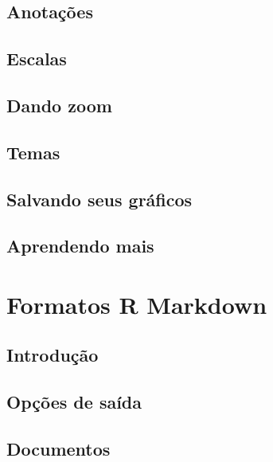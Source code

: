 \documentclass[
]{latex/krantz}
\theoremstyle{definition}
\theoremstyle{definition}
\theoremstyle{definition}
\theoremstyle{definition}
\theoremstyle{remark}
\begin{document}
\hypertarget{anotauxe7uxf5es}{%
\section{Anotações}\label{anotauxe7uxf5es}}

\hypertarget{escalas}{%
\section{Escalas}\label{escalas}}

\hypertarget{dando-zoom}{%
\section{Dando zoom}\label{dando-zoom}}

\hypertarget{temas}{%
\section{Temas}\label{temas}}

\hypertarget{salvando-seus-gruxe1ficos}{%
\section{Salvando seus gráficos}\label{salvando-seus-gruxe1ficos}}

\hypertarget{aprendendo-mais-2}{%
\section{Aprendendo mais}\label{aprendendo-mais-2}}

\hypertarget{formatos-r-markdown}{%
\chapter{Formatos R Markdown}\label{formatos-r-markdown}}

\hypertarget{introduuxe7uxe3o-19}{%
\section{Introdução}\label{introduuxe7uxe3o-19}}

\hypertarget{opuxe7uxf5es-de-sauxedda}{%
\section{Opções de saída}\label{opuxe7uxf5es-de-sauxedda}}

\hypertarget{documentos}{%
\section{Documentos}\label{documentos}}
\end{document}
